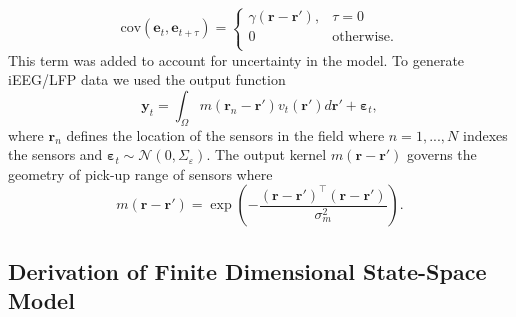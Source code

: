 \documentclass[12pt]{iopart}
\begin{document}
\begin{equation}\label{eq:FieldCovarianceFunction}
	\mathrm{cov}(\mathbf{e}_t,\mathbf{e}_{t+\tau}) = \left\{ 
	\begin{array}{*{20}
		{c}} \gamma\left(\mathbf{r}-\mathbf{r'}\right), & \tau=0 \\
		0 & \mathrm{otherwise}. \\
	\end{array}
	\right. 
\end{equation}
This term was added to account for uncertainty in the model. To generate iEEG/LFP data we used the output function 
\begin{equation}
	\mathbf{y}_t = \int_{\Omega}{m\left(\mathbf{r}_n-\mathbf{r}'\right)v_t\left(\mathbf{r}'\right)d\mathbf{r}'} + \boldsymbol{\varepsilon}_t, 
\end{equation}
where $\mathbf{r}_n$ defines the location of the sensors in the field where $n=1,...,N$ indexes the sensors and $\boldsymbol{\varepsilon}_t \sim \mathcal{N}\left(0,\Sigma_{\varepsilon}\right)$. The output kernel $m(\mathbf{r}-\mathbf{r}')$ governs the geometry of pick-up range of sensors where 
\begin{equation}
	m\left(\mathbf{r}-\mathbf{r}'\right) = \exp{\left(-\frac{(\mathbf{r}-\mathbf{r}')^\top(\mathbf{r}-\mathbf{r}')}{\sigma_m^2}\right)}. 
\end{equation}

\subsection{Derivation of Finite Dimensional State-Space Model} 
\end{document}

